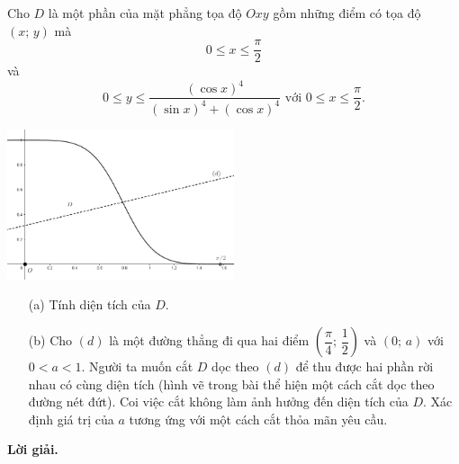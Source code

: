 \begin{tcolorbox}[title=\textbf{Bài toán B.5.},breakable]
    Cho $D$ là một phần của mặt phẳng tọa độ $Oxy$ gồm những điểm có tọa độ $(x;\,y)$ mà $$0 \leq x \leq \dfrac{\pi}{2}$$ và $$0 \leq y \leq \dfrac{(\cos x)^4}{(\sin x)^4 + (\cos x)^4}\text{ với }0 \leq x \leq \dfrac{\pi}{2}.$$
    \begin{center}
        \includegraphics[width=0.5\textwidth]{Figures/05.png}
    \end{center}
    \begin{enumerate}
        \item[(a)] {Tính diện tích của $D$.}
        \item[(b)] {Cho $(d)$ là một đường thẳng đi qua hai điểm $\left(\dfrac{\pi}{4};\,\dfrac{1}{2}\right)$ và $(0;\,a)$ với $0 < a < 1$. Người ta muốn cắt $D$ dọc theo $(d)$ để thu được hai phần rời nhau có cùng diện tích (hình vẽ trong bài thể hiện một cách cắt dọc theo đường nét đứt). Coi việc cắt không làm ảnh hưởng đến diện tích của $D$. Xác định giá trị của $a$ tương ứng với một cách cắt thỏa mãn yêu cầu.} 
    \end{enumerate}
\end{tcolorbox}

\textbf{Lời giải. }